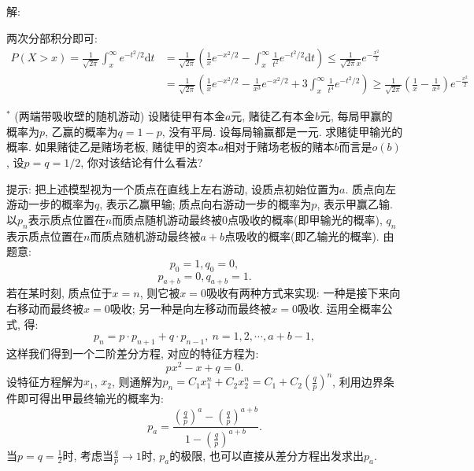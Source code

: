 \documentclass[standard]{ExBook}
\renewenvironment{shaded}{%
  \def\FrameCommand{\fboxsep=\FrameSep \colorbox{shadecolor}}%
  \MakeFramed{\advance\hsize-\width \FrameRestore}%
}{%
  \endMakeFramed
}
\begin{document}
\begin{qitems}
解: 

两次分部积分即可:
$$
\begin{aligned}
P(X>x)=\displaystyle\frac{1}{\sqrt{2\pi}}\int_{x}^{\infty}e^{-t^2/2}\mathrm{d}t &=\displaystyle\frac{1}{\sqrt{2\pi}}\left(\displaystyle\frac{1}{x}e^{-x^2/2}-\int_{x}^{\infty}\frac{1}{t^2}e^{-t^2/2}\mathrm{d}t\right) \leq \frac{1}{\sqrt{2\pi}x}e^{-\frac{x^2}{2}}\\
&=\displaystyle\frac{1}{\sqrt{2\pi}}\left(\displaystyle\frac{1}{x}e^{-x^2/2}-\frac{1}{x^3}e^{-x^2/2}+3\int_{x}^{\infty}\frac{1}{t^4}e^{-t^2/2}\right) \geq \frac{1}{\sqrt{2\pi}}\left(\frac{1}{x}-\frac{1}{x^3}\right)e^{-\frac{x^2}{2}}
\end{aligned}
$$

\vspace{2.5cm-5em}

    \begin{bbox}
    \begin{shaded}
        \qitem$^{*}$
(两端带吸收壁的随机游动) 设赌徒甲有本金$a$元, 赌徒乙有本金$b$元, 每局甲赢的概率为$p$, 乙赢的概率为$q = 1 - p$, 没有平局. 设每局输赢都是一元. 求赌徒甲输光的概率. 如果赌徒乙是赌场老板, 赌徒甲的资本$a$相对于赌场老板的赌本$b$而言是$o(b)$, 设$p = q = 1/2$, 你对该结论有什么看法?

提示: 把上述模型视为一个质点在直线上左右游动, 设质点初始位置为$a$. 质点向左游动一步的概率为$q$, 表示乙赢甲输; 质点向右游动一步的概率为$p$, 表示甲赢乙输. 以$p_{n}$表示质点位置在$n$而质点随机游动最终被0点吸收的概率(即甲输光的概率), $q_n$表示质点位置在$n$而质点随机游动最终被$a + b$点吸收的概率(即乙输光的概率). 由题意:
$$p_{0}=1,q_{0}=0,$$
$$p_{a+b}=0,q_{a+b}=1.$$
若在某时刻, 质点位于$x=n$, 则它被$x=0$吸收有两种方式来实现: 一种是接下来向右移动而最终被$x=0$吸收; 另一种是向左移动而最终被$x=0$吸收. 运用全概率公式, 得:
$$p_{n}=p\cdot p_{n+1}+q\cdot p_{n-1},\ n=1,2,\cdots,a+b-1,$$
这样我们得到一个二阶差分方程, 对应的特征方程为:
$$px^2-x+q=0.$$
设特征方程解为$x_{1}$, $x_{2}$, 则通解为$p_{n}=C_{1}x_{1}^{n}+C_{2}x_{2}^{n}=C_{1}+C_{2}\left(\frac{q}{p}\right)^{n}$, 利用边界条件即可得出甲最终输光的概率为:
$$p_{a}=\displaystyle\frac{\left(\frac{q}{p}\right)^{a}-\left(\frac{q}{p}\right)^{a+b}}{1-\left(\frac{q}{p}\right)^{a+b}}.$$
当$p=q=\frac{1}{2}$时, 考虑当$\frac{q}{p}\longrightarrow1$时, $p_{a}$的极限, 也可以直接从差分方程出发求出$p_{a}$.
    \end{shaded}
    \end{bbox}

\vspace{\dimexpr2.5cm-5em\relax}


\end{qitems}
\end{document}
